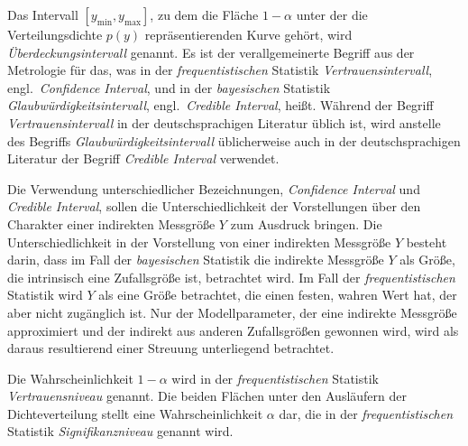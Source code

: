Das Intervall $[y_\mathrm{min}, y_\mathrm{max}]$, zu dem die Fläche $1 - \alpha$ unter der die
Verteilungsdichte $p(y)$ repräsentierenden Kurve gehört, wird \textsl{Überdeckungsintervall} genannt.
Es ist der verallgemeinerte Begriff aus der Metrologie für das, was in der
\textsl{frequentistischen} Statistik \textsl{Vertrauensintervall},
engl.\  \textsl{Confidence Interval}, und in der \textsl{bayesischen} Statistik 
\textsl{Glaubwürdigkeitsintervall}, engl.\ \textsl{Credible Interval},
heißt. Während der Begriff \textsl{Vertrauensintervall} in der deutschsprachigen
Literatur üblich ist, wird anstelle des Begriffs \textsl{Glaubwürdigkeitsintervall} üblicherweise
auch in der deutschsprachigen Literatur der Begriff \textsl{Credible Interval} verwendet.

Die Verwendung unterschiedlicher Bezeichnungen, \textsl{Confidence Interval} und
\textsl{Credible Interval}, sollen die Unterschiedlichkeit der Vorstellungen
über den Charakter einer indirekten Messgröße $Y$ zum Ausdruck bringen.
Die Unterschiedlichkeit in der Vorstellung von einer indirekten Messgröße $Y$ besteht darin,
dass im Fall der \textsl{bayesischen} Statistik
die indirekte Messgröße $Y$ als Größe, die intrinsisch eine Zufallsgröße ist, betrachtet
wird. Im Fall der \textsl{frequentistischen} Statistik wird $Y$ als eine Größe betrachtet,
die einen festen, wahren Wert hat, der aber nicht zugänglich ist. Nur der
Modellparameter, der eine indirekte Messgröße approximiert und der indirekt aus anderen 
Zufallsgrößen gewonnen wird, wird als daraus resultierend einer Streuung unterliegend betrachtet.

Die Wahrscheinlichkeit $1 - \alpha$ wird in der \textsl{frequentistischen} Statistik
\textsl{Vertrauensniveau} genannt. Die beiden Flächen unter den
Ausläufern der Dichteverteilung stellt eine Wahrscheinlichkeit $\alpha$ dar, die in der
\textsl{frequentistischen} Statistik \textsl{Signifikanzniveau} genannt wird.

